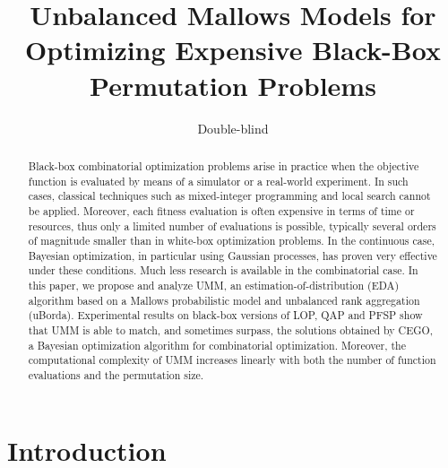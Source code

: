 \documentclass[runningheads]{llncs}
\title{Unbalanced Mallows Models for Optimizing Expensive Black-Box Permutation Problems}
\author{Double-blind}
\date{}%
\begin{document}
\maketitle

\begin{abstract}
  Black-box combinatorial optimization problems arise in practice when the
  objective function is evaluated by means of a simulator or a real-world
  experiment. In such cases, classical techniques such as mixed-integer
  programming and local search cannot be applied. Moreover, each fitness
  evaluation is often expensive in terms of time or resources, thus only a
  limited number of evaluations is possible, typically several orders of
  magnitude smaller than in white-box optimization problems. In the continuous
  case, Bayesian optimization, in particular using Gaussian processes, has
  proven very effective under these conditions. Much less research is available
  in the combinatorial case. In this paper, we propose and analyze UMM, an
  estimation-of-distribution (EDA) algorithm based on a Mallows probabilistic
  model and unbalanced rank aggregation (uBorda). Experimental results on
  black-box versions of LOP, QAP and PFSP show that UMM is able to match, and
  sometimes surpass, the solutions obtained by CEGO, a Bayesian optimization
  algorithm for combinatorial optimization. %
  Moreover, the computational complexity of UMM increases linearly with both the number of function evaluations and the permutation size.
  \sloppy
\end{abstract}

\section{Introduction}
\end{document}
